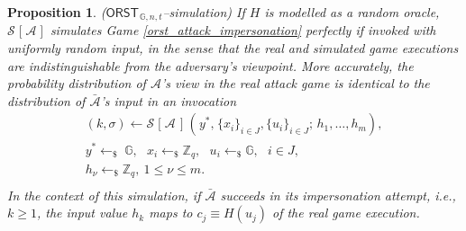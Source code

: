 \documentclass[psamsfonts, reqno]{amsart}
\newtheorem{prop}[thm]{Proposition}
\theoremstyle{definition}
\theoremstyle{remark}
\numberwithin{equation}{section}
\begin{document}
\begin{prop}\label{orst_simulated_impersonation_attack_prop}
\textup{($\mathsf{ORST}_{\hspace{1pt}\mathbb{G}, n, t}$\textup{\hspace{1pt}--\hspace{1pt}simulation})}
If $H$ is modelled as a random oracle,
$\mathcal{S}\hspace{1pt}[\hspace{1pt}\mathcal{A}\hspace{1pt}]$
simulates Game \ref{orst_attack_impersonation} perfectly
if invoked with uniformly random input,
in the sense that the real and simulated game executions
are indistinguishable from the adversary's viewpoint.
More accurately, the probability distribution of $\mathcal{A}$'s view
in the real attack game
is identical to the distribution of $\mathcal{\bar{A}}$'s
input in an invocation
\vspace{8pt}
\begin{equation}\label{orst_attack_simulated}
\begin{split}
(k, \sigma) \leftarrow \mathcal{S}
	\hspace{1pt}[
		\hspace{1pt}\mathcal{A}
	\hspace{2pt}]
	\hspace{1pt}
(
	\hspace{1pt}
	y^*,
	\hspace{1pt} \{x_i\}_{i \in J},
	\{u_i\}_{i \in J};
	\hspace{2pt} h_1, \dots, h_m
),\\[5pt]
y^* \leftarrow_\$ \hspace{3pt}\mathbb{G},
\ \ \ x_i \leftarrow_\$ \mathbb{Z}_q,
\ \ \ u_i \leftarrow_\$ \mathbb{G},
\ \ \ i \in J,\\[5pt]
h_\nu \leftarrow_\$ \mathbb{Z}_q,\ 1 \le \nu \le m.\\[8pt]
\end{split}
\end{equation}
In the context of this simulation, if $\mathcal{\bar{A}}$
succeeds in its impersonation attempt,
i.e., $k \ge 1$, the input value $h_k$ maps
to $c_j \equiv H(u_j)$ of the real game execution.
\end{prop}
\end{document}
